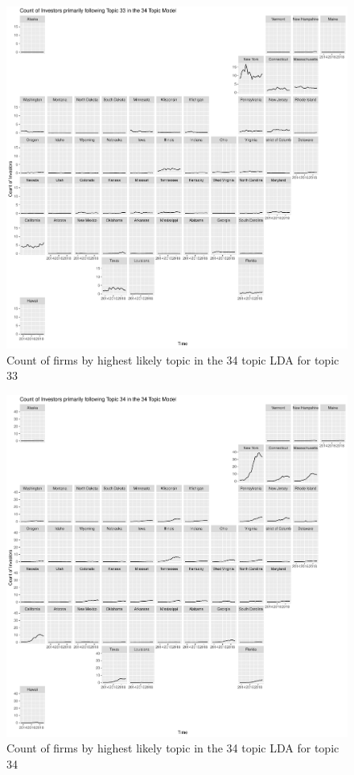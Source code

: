 \begin{figure}
	\centering
	\includegraphics[width=1\linewidth]{Figures/ChapterV/USA_34_Topic33.pdf}
	\caption[Count of Firms for Topic 33 by Quarter]{Count of firms by highest likely topic in the 34 topic LDA for topic 33}
	\label{fig:StateLDA33}
\end{figure}

\begin{figure}
	\centering
	\includegraphics[width=1\linewidth]{Figures/ChapterV/USA_34_Topic34.pdf}
	\caption[Count of Firms for Topic 34 by Quarter]{Count of firms by highest likely topic in the 34 topic LDA for topic 34}
	\label{fig:StateLDA34}
\end{figure}

